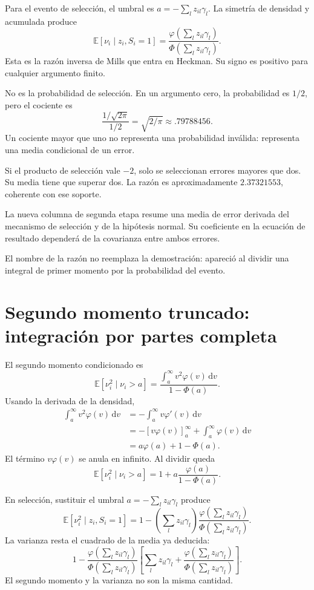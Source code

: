 \documentclass[11pt,a4paper]{article}
\newcommand{\E}{\mathbb E}
\newcommand{\dd}{\,\mathrm d}
\begin{document}
Para el evento de selección,
el umbral es \(a=-\sum_lz_{il}\gamma_l\).
La simetría de densidad y acumulada produce
\[
\boxed{
\E[\nu_i\mid z_i,S_i=1]
=\frac{\varphi(\sum_lz_{il}\gamma_l)}
{\Phi(\sum_lz_{il}\gamma_l)}}.
\]
Esta es la razón inversa de Mills
que entra en Heckman.
Su signo es positivo para cualquier
argumento finito.

No es la probabilidad de selección.
En un argumento cero,
la probabilidad es \(1/2\),
pero el cociente es
\[
\frac{1/\sqrt{2\pi}}{1/2}
=\sqrt{2/\pi}\approx.79788456.
\]
Un cociente mayor que uno
no representa una probabilidad inválida:
representa una media condicional de un error.

\begin{ejemplo}
Si el producto de selección vale \(-2\),
solo se seleccionan errores mayores que dos.
Su media tiene que superar dos.
La razón es aproximadamente \(2.37321553\),
coherente con ese soporte.
\end{ejemplo}
La nueva columna de segunda etapa
resume una media de error derivada
del mecanismo de selección y
de la hipótesis normal.
Su coeficiente en la ecuación
de resultado dependerá de la
covarianza entre ambos errores.

El nombre de la razón no reemplaza
la demostración: apareció al dividir
una integral de primer momento
por la probabilidad del evento.

\clearpage
\section{Segundo momento truncado: integración por partes completa}\label{unidad68}
El segundo momento condicionado es
\[
\E[\nu_i^2\mid\nu_i>a]
=\frac{\int_a^\infty v^2\varphi(v)\dd v}
{1-\Phi(a)}.
\]
Usando la derivada de la densidad,
\[
\begin{aligned}
\int_a^\infty v^2\varphi(v)\dd v
&=-\int_a^\infty v\varphi'(v)\dd v\\
&=-[v\varphi(v)]_a^\infty
+\int_a^\infty\varphi(v)\dd v\\
&=a\varphi(a)+1-\Phi(a).
\end{aligned}
\]
El término \(v\varphi(v)\) se anula
en infinito.
Al dividir queda
\[
\E[\nu_i^2\mid\nu_i>a]
=1+a\frac{\varphi(a)}{1-\Phi(a)}.
\]

En selección, sustituir el umbral
\(a=-\sum_lz_{il}\gamma_l\) produce
\[
\E[\nu_i^2\mid z_i,S_i=1]
=1-\left(\sum_lz_{il}\gamma_l\right)
\frac{\varphi(\sum_lz_{il}\gamma_l)}
{\Phi(\sum_lz_{il}\gamma_l)}.
\]
La varianza resta el cuadrado
de la media ya deducida:
\[
\boxed{
1-\frac{\varphi(\sum_lz_{il}\gamma_l)}
{\Phi(\sum_lz_{il}\gamma_l)}
\left[
\sum_lz_{il}\gamma_l
+\frac{\varphi(\sum_lz_{il}\gamma_l)}
{\Phi(\sum_lz_{il}\gamma_l)}
\right]}.
\]
El segundo momento y la varianza
no son la misma cantidad.
\end{document}
